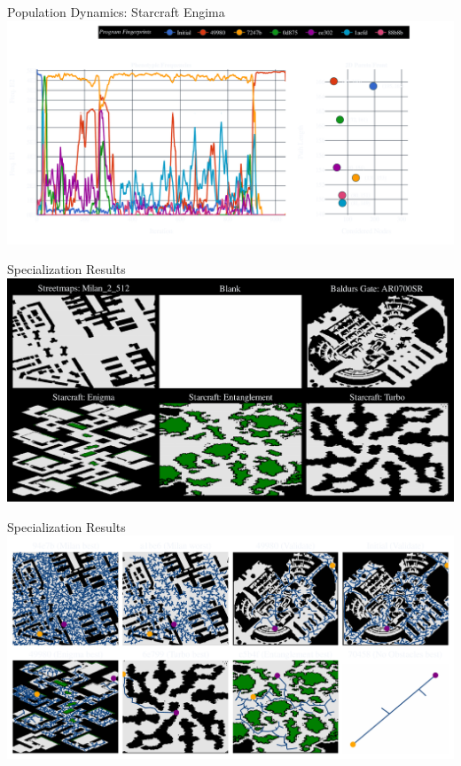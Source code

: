 \documentclass[aspectratio=169]{beamer}
\begin{document}
\begin{frame}{Population Dynamics: Starcraft Engima}
    \includegraphics[width=1.0\linewidth, keepaspectratio]{figures/pheno.pdf}
\end{frame}

\begin{frame}{Specialization Results}
    \centering
    \includegraphics[width=0.8\linewidth, keepaspectratio]{figures/show_maps_exp.pdf}
\end{frame}

\begin{frame}{Specialization Results}
    \includegraphics[width=1.0\linewidth, keepaspectratio]{figures/learned.pdf}
\end{frame}
\end{document}
